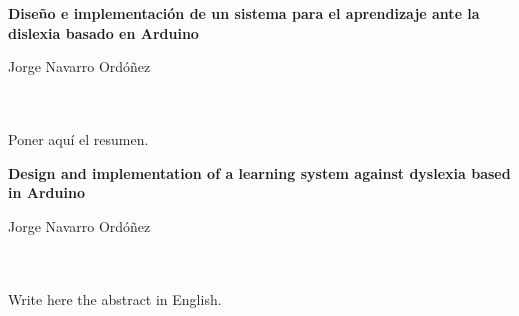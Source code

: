 \chapter*{}






\cleardoublepage
\thispagestyle{empty}

\begin{center}
{\large\bfseries Diseño e implementación de un sistema para el aprendizaje ante la dislexia basado en Arduino}\\
\end{center}
\begin{center}
Jorge Navarro Ordóñez\\
\end{center}

\\

\vspace{0.7cm}
\\

Poner aquí el resumen.
\cleardoublepage


\thispagestyle{empty}


\begin{center}
{\large\bfseries Design and implementation of a learning system against dyslexia based in Arduino}\\
\end{center}
\begin{center}
Jorge Navarro Ordóñez\\
\end{center}

\\

\vspace{0.7cm}
\\

Write here the abstract in English.

\chapter*{}
\thispagestyle{empty}

